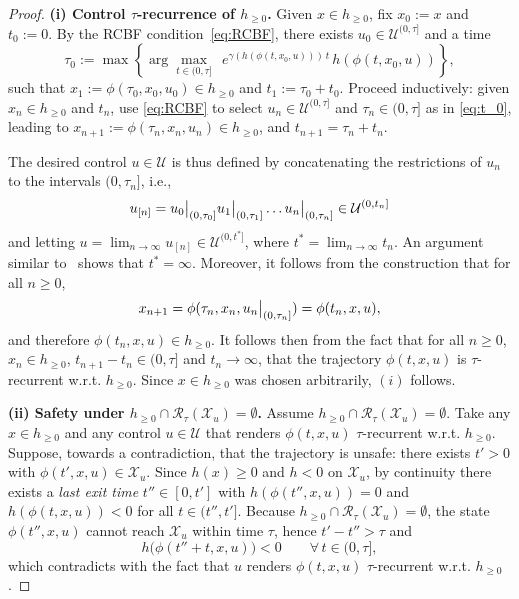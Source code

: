\documentclass[letterpaper, 10 pt, conference]{ieeeconf}
\newcommand{\X}{\mathcal{X}}
\newcommand{\U}{\mathcal{U}}
\newcommand\restr[2]{{%
  \left.\kern-\nulldelimiterspace %
  #1 %
  \littletaller %
  \right|_{#2} %
  }}
\newcommand{\littletaller}{\mathchoice{\vphantom{\big|}}{}{}{}}
\begin{document}
\begin{proof}
\textbf{(i) Control $\tau$-recurrence of $h_{\ge 0}$.}
Given $x\in h_{\ge 0}$, fix $x_0:=x$ and $t_0:=0$. By the RCBF condition~\eqref{eq:RCBF}, there exists
$u_0\in\U^{(0,\tau]}$ and a time
\begin{equation}\label{eq:t_0}
\tau_0 := \max\left\{ \arg\max_{t\in(0,\tau]}\ 
\ e^{\gamma(h(\phi(t,x_0,u)))\,t}\,h(\phi(t,x_0,u))\right\},
\end{equation}
such that $x_1:=\phi(\tau_0,x_0,u_0)\in h_{\ge 0}$ and $t_1:=\tau_0+t_0$. Proceed inductively: given $x_n\in h_{\ge0}$ and $t_n$, use \eqref{eq:RCBF} to select $u_n\in\U^{(0,\tau]}$ and
$\tau_n\in(0,\tau]$ as in \eqref{eq:t_0}, leading to $x_{n+1}:=\phi(\tau_{n},x_{n},u_{n})\in h_{\ge 0}$, and $t_{n+1}=\tau_n+t_n$.

The desired control $u\in \U$ is thus defined by concatenating the restrictions of ${u_n}$ to the intervals ${(0,\tau_n]}$, i.e.,
\[
u_{[n]}=\restr{u_0}{(0,\tau_0]}\restr{u_1}{(0,\tau_1]}\dots\restr{u_n}{(0,\tau_n]} \in \U^{(0,t_n]}
\]
and letting $u=\lim_{n\to\infty}u_{[n]}\in \U^{(0,t^*]}$, where $t^*=\lim_{n\rightarrow\infty} t_n$. An argument similar to~\cite[Lemma 1]{sspm2023cdc} shows that $t^*=\infty$. Moreover, it follows from the construction that for all $n\ge0$,
\begin{align}
    x_{n+1} =\phi(\tau_n,x_n,\restr{u_n}{(0,\tau_n]}) = \phi(t_n,x,u),
\end{align}
and therefore $\phi(t_n,x,u)\in h_{\ge0}$.
It follows then from the fact that for all $n\geq0$, $x_n\in h_{\ge0}$, $t_{n+1}-t_n\in(0,\tau]$ and $t_n\to \infty$, that the trajectory $\phi(t,x,u)$ is $\tau$-recurrent w.r.t. $h_{\ge0}$. Since $x\in h_{\ge0}$ was chosen arbitrarily, $(i)$ follows.

\medskip
\noindent\textbf{(ii) Safety under $h_{\ge 0}\cap \mathcal{R}_\tau(\mathcal{X}_u)=\emptyset$.}
Assume $h_{\ge 0}\cap \mathcal{R}_\tau(\mathcal{X}_u)=\emptyset$. Take any
$x\in h_{\ge 0}$ and any control $u\in\U$ that renders $\phi(t,x,u)$
$\tau$-recurrent w.r.t. $h_{\ge0}$. Suppose, towards a contradiction, that the trajectory is unsafe: there exists $t'>0$ with $\phi(t',x,u)\in\X_u$. Since $h(x)\ge 0$ and $h<0$ on $\X_u$, by continuity there exists a \emph{last exit time} $t''\in[0,t']$ with
$h(\phi(t'',x,u))=0$ and $h(\phi(t,x,u))<0$ for all $t\in(t'',t']$.
Because $h_{\ge 0}\cap \mathcal{R}_\tau(\mathcal{X}_u)=\emptyset$, the state
$\phi(t'',x,u)$ cannot reach $\X_u$ within time $\tau$, hence $t'-t''>\tau$ and
\[
h\big(\phi(t''+t,x,u)\big)<0\qquad\forall\,t\in(0,\tau],
\]
which contradicts with the fact that $u$ renders $\phi(t,x,u)$ $\tau$-recurrent w.r.t. $h_{\ge0}$.
\end{proof}
\end{document}

